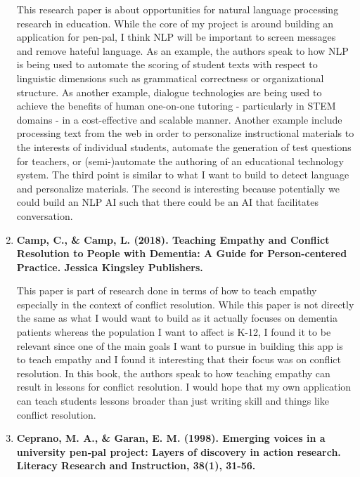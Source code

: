 \documentclass[12pt, final]{article}
\begin{document}
\begin{enumerate}
This research paper is about opportunities for natural language processing research in education. While the core of my project is around building an application for pen-pal, I think NLP will be important to screen messages and remove hateful language. As an example, the authors speak to how NLP is being used to automate the scoring of student texts with respect to linguistic dimensions such as grammatical correctness or organizational structure. As another example, dialogue technologies are being used to achieve the benefits of human one-on-one tutoring - particularly in STEM domains - in a cost-effective and scalable manner. Another example include processing text from the web in order to personalize instructional materials to the interests of individual students, automate the generation of test questions for teachers, or (semi-)automate the authoring of an educational technology system. The third point is similar to what I want to build to detect language and personalize materials. The second is interesting because potentially we could build an NLP AI such that there could be an AI that facilitates conversation. 

\item \textbf{Camp, C., \& Camp, L. (2018). Teaching Empathy and Conflict Resolution to People with Dementia: A Guide for Person-centered Practice. Jessica Kingsley Publishers.}

This paper is part of research done in terms of how to teach empathy especially in the context of conflict resolution. While this paper is not directly the same as what I would want to build as it actually focuses on dementia patients whereas the population I want to affect is K-12, I found it to be relevant since one of the main goals I want to pursue in building this app is to teach empathy and I found it interesting that their focus was on conflict resolution. In this book, the authors speak to how teaching empathy can result in lessons for conflict resolution. I would hope that my own application can teach students lessons broader than just writing skill and things like conflict resolution. 

\item \textbf{Ceprano, M. A., \& Garan, E. M. (1998). Emerging voices in a university pen‐pal project: Layers of discovery in action research. Literacy Research and Instruction, 38(1), 31-56.}


\end{enumerate}
\end{document}
